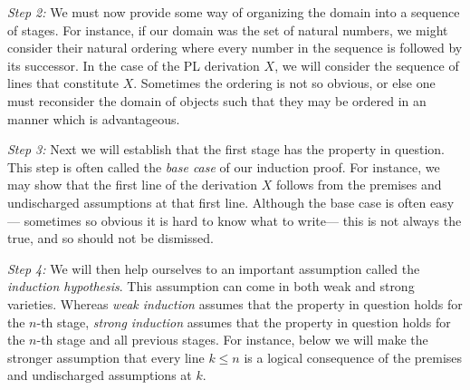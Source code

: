 \textit{Step 2:} 
We must now provide some way of organizing the domain into a sequence of stages.
For instance, if our domain was the set of natural numbers, we might consider their natural ordering where every number in the sequence is followed by its successor.
In the case of the PL derivation $X$, we will consider the sequence of lines that constitute $X$.
Sometimes the ordering is not so obvious, or else one must reconsider the domain of objects such that they may be ordered in an manner which is advantageous.

\textit{Step 3:} 
Next we will establish that the first stage has the property in question.
This step is often called the \textit{base case} of our induction proof.
For instance, we may show that the first line of the derivation $X$ follows from the premises and undischarged assumptions at that first line. %
Although the base case is often easy--- sometimes so obvious it is hard to know what to write--- this is not always the true, and so should not be dismissed.

\textit{Step 4:} 
We will then help ourselves to an important assumption called the \textit{induction hypothesis}.
This assumption can come in both weak and strong varieties.
Whereas \textit{weak induction} assumes that the property in question holds for the $n$-th stage, \textit{strong induction} assumes that the property in question holds for the $n$-th stage and all previous stages.
For instance, below we will make the stronger assumption that every line $k \leq n$ is a logical consequence of the premises and undischarged assumptions at $k$.


